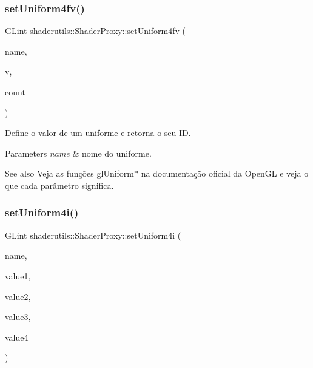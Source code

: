 \subsubsection{\texorpdfstring{set\+Uniform4fv()}{setUniform4fv()}}
{\footnotesize\ttfamily G\+Lint shaderutils\+::\+Shader\+Proxy\+::set\+Uniform4fv (\begin{DoxyParamCaption}\item[{const char $\ast$}]{name,  }\item[{const G\+Lfloat $\ast$}]{v,  }\item[{G\+Luint}]{count }\end{DoxyParamCaption})\hspace{0.3cm}{\ttfamily [inline]}}

Define o valor de um uniforme e retorna o seu ID. 
\begin{DoxyParams}{Parameters}
{\em name} & nome do uniforme. \\
\hline
\end{DoxyParams}
\begin{DoxySeeAlso}{See also}
Veja as funções gl\+Uniform$\ast$ na documentação oficial da Open\+GL e veja o que cada parâmetro significa. 
\end{DoxySeeAlso}
\mbox{\label{classshaderutils_1_1_shader_proxy_a3ec8af1a684b93b897b03e8887b0b222}} 
\subsubsection{\texorpdfstring{set\+Uniform4i()}{setUniform4i()}}
{\footnotesize\ttfamily G\+Lint shaderutils\+::\+Shader\+Proxy\+::set\+Uniform4i (\begin{DoxyParamCaption}\item[{const char $\ast$}]{name,  }\item[{G\+Lint}]{value1,  }\item[{G\+Lint}]{value2,  }\item[{G\+Lint}]{value3,  }\item[{G\+Lint}]{value4 }\end{DoxyParamCaption})\hspace{0.3cm}{\ttfamily [inline]}}

